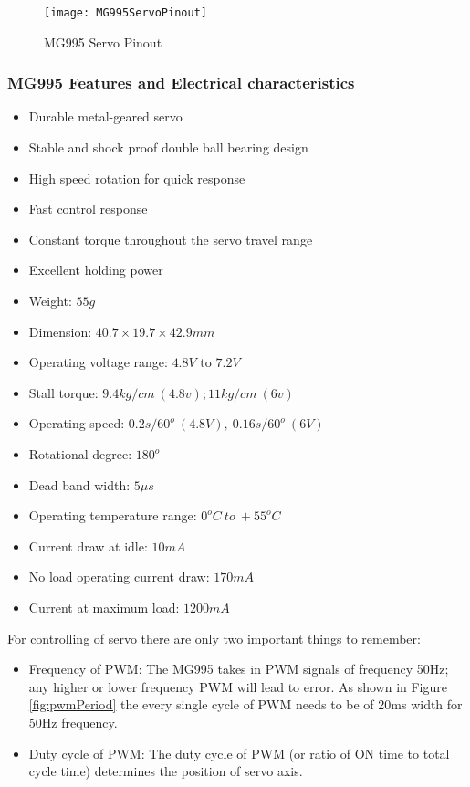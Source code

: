 \begin{figure}[H]
    \centering
        \texttt{[image: MG995ServoPinout]}
        \caption{MG995 Servo Pinout}
        \label{fig:MG995ServoPinout}
\end{figure}

\subsubsection{MG995 Features and Electrical characteristics}

\begin{itemize}
    \item Durable metal-geared servo
    \item Stable and shock proof double ball bearing design
    \item High speed rotation for quick response
    \item Fast control response
    \item Constant torque throughout the servo travel range
    \item Excellent holding power
    \item Weight: \(55 g\)
    \item Dimension: \(40.7 \times 19.7 \times 42.9mm\)
    \item Operating voltage range: \(4.8 V\) to \(7.2 V\) 
    \item Stall torque: \(9.4kg/cm \ (4.8v); 11kg/cm \ (6v)\)
    \item Operating speed: \(0.2s/60^o \ (4.8 V), \ 0.16s/60^o \ (6 V)\)
    \item Rotational degree: \(180^o\)
    \item Dead band width: \(5 \mu s\)
    \item Operating temperature range: \(0^oC \ to \ +55^oC\)
    \item Current draw at idle: \(10mA\)
    \item No load operating current draw: \(170mA\)
    \item Current at maximum load: \(1200mA\)
\end{itemize}

For controlling of servo there are only two important things to remember:

\begin{itemize}
    \item Frequency of PWM: The MG995 takes in PWM signals of frequency 50Hz; any higher or lower frequency PWM will lead to error. As shown in Figure \ref {fig:pwmPeriod} the every single cycle of PWM needs to be of 20ms width for 50Hz frequency.
    \item Duty cycle of PWM: The duty cycle of PWM (or ratio of ON time to total cycle time) determines the position of servo axis.
\end{itemize}

